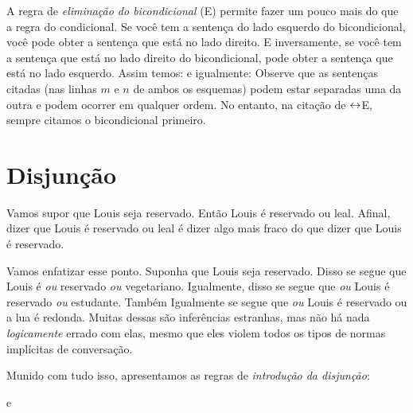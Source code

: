 A regra de \textit{eliminação do bicondicional} ({\eiff}E) permite fazer um pouco mais do que a regra do condicional.  Se você tem a sentença do lado esquerdo do bicondicional, você pode obter a sentença que está no lado direito. E inversamente, se você tem a sentença que está no lado direito do bicondicional, pode obter a sentença que está no lado esquerdo. Assim temos:
\noindent e igualmente:
Observe que as sentenças citadas (nas linhas $m$ e $n$ de ambos os esquemas) podem estar separadas uma da outra e podem ocorrer em qualquer ordem.
 No entanto, na citação de $\leftrightarrow$E, sempre citamos o  bicondicional primeiro.


\section{Disjunção}
Vamos supor que Louis seja reservado.  Então Louis é reservado ou leal. Afinal, dizer que Louis é reservado ou leal é dizer algo mais fraco do que dizer que Louis é reservado. 

Vamos enfatizar esse ponto. Suponha que Louis seja reservado. Disso se segue que  Louis é \emph{ou} reservado \emph{ou} vegetariano.  Igualmente,  disso se segue que \emph{ou} Louis   é reservado \emph{ou} estudante. Também  Igualmente se segue que   \emph{ou} Louis é reservado ou a lua é redonda. Muitas dessas são inferências estranhas, mas não há nada \emph{logicamente} errado com elas, mesmo que eles violem todos os tipos de normas implícitas de conversação.

Munido com tudo isso, apresentamos as regras de \textit{introdução da disjunção}:

e

